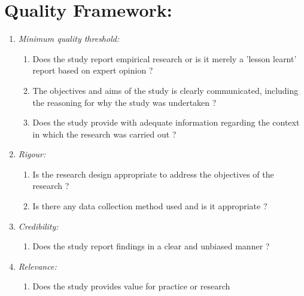 \documentclass{article}
\theoremstyle{mytheoremstyle}
\theoremstyle{mytheoremstyle}
\theoremstyle{myproblemstyle}
\begin{document}
      \section{Quality Framework:}
      \begin{enumerate}
        \item \emph{Minimum quality threshold:} 
        \begin{enumerate}
            \item Does the study report empirical research or is it merely a 'lesson learnt' report based on expert opinion ?
            \item The objectives and aims of the study is clearly communicated, including the reasoning for why the study was undertaken ? 
            \item Does the study provide with adequate information regarding the context in which the research was carried out ?
        \end{enumerate}
        \item \emph{Rigour:}
        \begin{enumerate}
            \item Is the research design appropriate to address the objectives of the research ?
            \item Is there any data collection method used and is it appropriate ?
        \end{enumerate}
        \item \emph{Credibility:}
          \begin{enumerate}
            \item Does the study report findings in a clear and unbiased manner ? 
         \end{enumerate}
        \item \emph{Relevance:}
        \begin{enumerate}
            \item Does the study provides value for practice or research 
         \end{enumerate}
    \end{enumerate}
      
  
 
\end{document}
